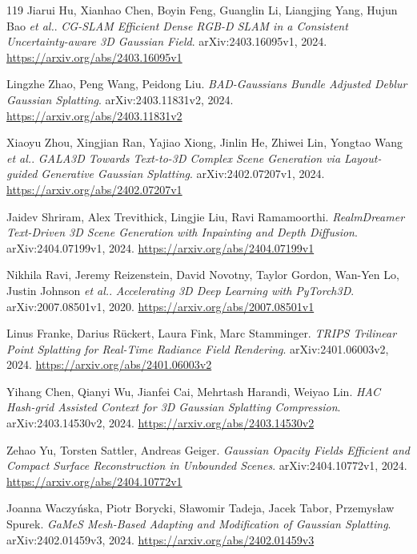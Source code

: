 \documentclass[11pt,a4paper]{article}
\begin{document}
\begin{thebibliography}{119}
Jiarui Hu, Xianhao Chen, Boyin Feng, Guanglin Li, Liangjing Yang, Hujun Bao \emph{et al.}.
\newblock \emph{CG-SLAM Efficient Dense RGB-D SLAM in a Consistent Uncertainty-aware 3D Gaussian Field}.
\newblock arXiv:2403.16095v1, 2024.
\newblock \url{https://arxiv.org/abs/2403.16095v1}

Lingzhe Zhao, Peng Wang, Peidong Liu.
\newblock \emph{BAD-Gaussians Bundle Adjusted Deblur Gaussian Splatting}.
\newblock arXiv:2403.11831v2, 2024.
\newblock \url{https://arxiv.org/abs/2403.11831v2}

Xiaoyu Zhou, Xingjian Ran, Yajiao Xiong, Jinlin He, Zhiwei Lin, Yongtao Wang \emph{et al.}.
\newblock \emph{GALA3D Towards Text-to-3D Complex Scene Generation via Layout-guided Generative Gaussian Splatting}.
\newblock arXiv:2402.07207v1, 2024.
\newblock \url{https://arxiv.org/abs/2402.07207v1}

Jaidev Shriram, Alex Trevithick, Lingjie Liu, Ravi Ramamoorthi.
\newblock \emph{RealmDreamer Text-Driven 3D Scene Generation with Inpainting and Depth Diffusion}.
\newblock arXiv:2404.07199v1, 2024.
\newblock \url{https://arxiv.org/abs/2404.07199v1}

Nikhila Ravi, Jeremy Reizenstein, David Novotny, Taylor Gordon, Wan-Yen Lo, Justin Johnson \emph{et al.}.
\newblock \emph{Accelerating 3D Deep Learning with PyTorch3D}.
\newblock arXiv:2007.08501v1, 2020.
\newblock \url{https://arxiv.org/abs/2007.08501v1}

Linus Franke, Darius R\"{u}ckert, Laura Fink, Marc Stamminger.
\newblock \emph{TRIPS Trilinear Point Splatting for Real-Time Radiance Field Rendering}.
\newblock arXiv:2401.06003v2, 2024.
\newblock \url{https://arxiv.org/abs/2401.06003v2}

Yihang Chen, Qianyi Wu, Jianfei Cai, Mehrtash Harandi, Weiyao Lin.
\newblock \emph{HAC Hash-grid Assisted Context for 3D Gaussian Splatting Compression}.
\newblock arXiv:2403.14530v2, 2024.
\newblock \url{https://arxiv.org/abs/2403.14530v2}

Zehao Yu, Torsten Sattler, Andreas Geiger.
\newblock \emph{Gaussian Opacity Fields Efficient and Compact Surface Reconstruction in Unbounded Scenes}.
\newblock arXiv:2404.10772v1, 2024.
\newblock \url{https://arxiv.org/abs/2404.10772v1}

Joanna Waczy\'{n}ska, Piotr Borycki, S\l{}awomir Tadeja, Jacek Tabor, Przemys\l{}aw Spurek.
\newblock \emph{GaMeS Mesh-Based Adapting and Modification of Gaussian Splatting}.
\newblock arXiv:2402.01459v3, 2024.
\newblock \url{https://arxiv.org/abs/2402.01459v3}


\end{thebibliography}
\end{document}
